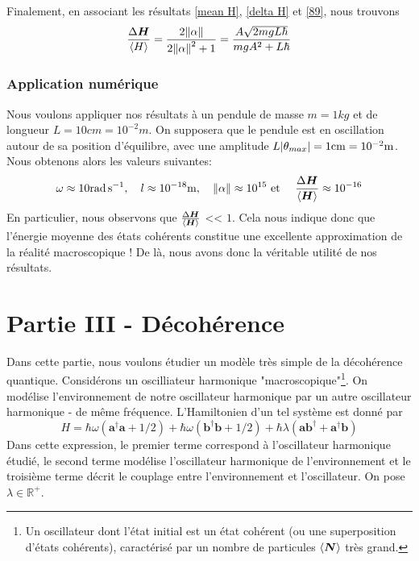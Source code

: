 \documentclass[11pt,oneside,a4paper]{article}
\newcommand{\h}{\ensuremath{\hbar}}
\begin{document}
Finalement, en associant les résultats \eqref{mean H}, \eqref{delta H} et \eqref{89}, nous trouvons
\begin{equation}
  \frac{\Delta \bm{H}}{\expval{H}} = \frac{2\norm{\alpha}}{2\norm{\alpha}^2+1} = \frac{A\sqrt{2mgL\h}}{mgA^2+L\h}\label{eq:Delta H/expval H}
\end{equation}
\subsubsection{Application numérique}\label{sec:application numerique}
Nous voulons appliquer nos résultats à un pendule de masse $m=1\si{kg}$ et de longueur $L=10\si{cm} = 10^{-2}\si{m}$. On supposera que le pendule est en oscillation autour de sa position d'équilibre, avec une amplitude $L\absolutevalue{\theta_{max}} = 1\si{cm} = \num{e-2}\unit{\meter}$.\\

Nous obtenons alors les valeurs suivantes: 
\begin{equation*}
  \omega \approx 10\unit{\radian\per\second}, \quad l \approx \num{e-18}\unit{\metre}, \quad \norm{\alpha} \approx \num{e+15} \text{ et } \quad \frac{\Delta\bm{H}}{\expval{\bm{H}}} \approx \num{e-16}
\end{equation*}
En particulier, nous observons que $\frac{\Delta\bm{H}}{\expval{\bm{H}}}$ << $1$. Cela nous indique donc que l'énergie moyenne des états cohérents constitue une excellente approximation de la réalité macroscopique ! De là, nous avons donc la véritable utilité de nos résultats.

\section{Partie III - Décohérence}
\label{partie 3}
Dans cette partie, nous voulons étudier un modèle très simple de la décohérence quantique. Considérons un oscilliateur harmonique "macroscopique"\footnote{Un oscillateur dont l'état initial est un état cohérent (ou une superposition d'états cohérents), caractérisé  par un nombre de particules $\expval{\bm{N}}$ très grand.}. On modélise l'environnement de notre oscillateur harmonique par un autre oscillateur harmonique - de même fréquence. L'Hamiltonien d'un tel système est donné par
\begin{equation}
  \label{eq:Hamiltonien partie III}
  H = \h\omega\left(\bm{a}^\dagger\bm{a}+1/2\right)+\h\omega\left(\bm{b}^\dagger\bm{b}+1/2\right)+\h\lambda\left(\bm{a}\bm{b}^\dagger+\bm{a}^\dagger\bm{b}\right)
\end{equation}
Dans cette expression, le premier terme correspond à l'oscillateur harmonique étudié, le second terme modélise l'oscillateur harmonique de l'environnement et le troisième terme décrit le couplage entre l'environnement et l'oscillateur. On pose $\lambda\in\mathbb{R}^+$.
\end{document}
